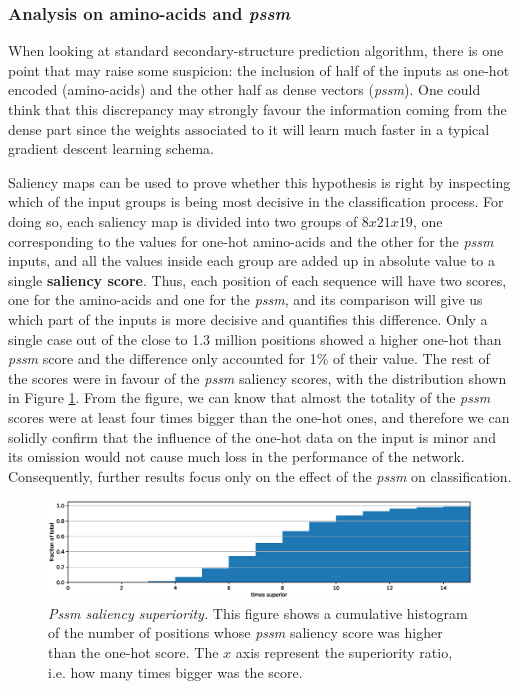 
\subsubsection*{Analysis on amino-acids and \textit{pssm}}
When looking at standard secondary-structure prediction algorithm, there is one point that may raise some suspicion: the inclusion of half of the inputs as one-hot encoded (amino-acids) and the other half as dense vectors (\textit{pssm}). One could think that this discrepancy may strongly favour the information coming from the dense part since the weights associated to it will learn much faster in a typical gradient descent learning schema.

Saliency maps can be used to prove whether this hypothesis is right by inspecting which of the input groups is being most decisive in the classification process. For doing so, each saliency map is divided into two groups of $8x21x19$, one corresponding to the values for one-hot amino-acids and the other for the \textit{pssm} inputs, and all the values inside each group are added up in absolute value to a single \textbf{saliency score}. Thus, each position of each sequence will have two scores, one for the amino-acids and one for the \textit{pssm}, and its comparison will give us which part of the inputs is more decisive and quantifies this difference. Only a single case out of the close to 1.3 million positions showed a higher one-hot than \textit{pssm} score and the difference only accounted for 1\% of their value. The rest of the scores were in favour of the \textit{pssm} saliency scores, with the distribution shown in Figure \ref{fig:aa_pssm}. From the figure, we can know that almost the totality of the \textit{pssm} scores were at least four times bigger than the one-hot ones, and therefore we can solidly confirm that the influence of the one-hot data on the input is minor and its omission would not cause much loss in the performance of the network. Consequently, further results focus only on the effect of the \textit{pssm} on classification.

\begin{figure}
	\centering
	\includegraphics[width=1\linewidth]{Figures/aa_pssm}
	\caption{\textit{Pssm saliency superiority.} This figure shows a cumulative histogram of the number of positions whose \textit{pssm} saliency score was higher than the one-hot score. The $x$ axis represent the superiority ratio, i.e. how many times bigger was the score.}
	\label{fig:aa_pssm}
\end{figure}


